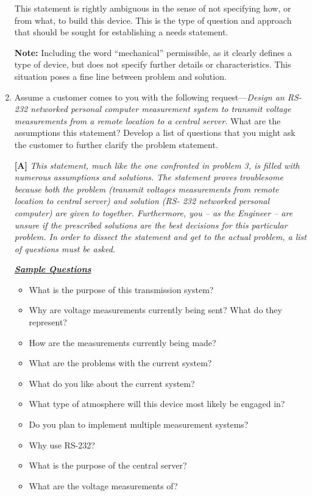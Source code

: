 \begin{enumerate}
\begin{onlysolution}
  This statement is rightly ambiguous in the sense of not specifying 
  how, or from what, to build this device. This is the type of question 
  and approach that should be sought for establishing a needs statement.
  
   \hspace*{1cm}
  \begin{minipage}{.8\textwidth}
  \textbf{Note:} Including the word “mechanical” 
   permissible, as it 
  clearly defines a type of device, but does not specify further details 
  or characteristics. This situation poses a fine line between problem 
  and solution.
  \end{minipage}
  \end{onlysolution}

\item
  Assume a customer comes to you with the following
  request---\emph{Design an RS-232 networked personal computer
  measurement system to transmit voltage measurements from a remote
  location to a central server.} What are the assumptions this
  statement? Develop a list of questions that you might ask the customer
  to further clarify the problem statement.

  \begin{onlysolution}
  \textbf{[A]}
  \itshape
  This statement, much like the one confronted in problem 3, is filled 
  with numerous assumptions and solutions. The statement proves troublesome 
  because both the problem (transmit voltages measurements from remote 
  location to central server) and solution (RS- 232 networked personal computer) 
  are given to together. Furthermore, you – as the Engineer – are unsure if 
  the prescribed solutions are the best decisions for this particular problem. 
  In order to dissect the statement and get to the actual problem, a list of 
  questions must be asked.
  
  \underline{\textit{\textbf{Sample Questions}}}
  \begin{itemize}
    \item What is the purpose of this transmission system?
    \item Why are voltage measurements currently being sent? What do they represent?
    \item How are the measurements currently being made?
    \item What are the problems with the current system?
    \item What do you like about the current system?
    \item What type of atmosphere will this device most likely be engaged in?
    \item Do you plan to implement multiple measurement systems?
    \item Why use RS-232?
    \item What is the purpose of the central server?
    \item What are the voltage measurements of?
  \end{itemize}
  

\end{onlysolution}
\end{enumerate}
